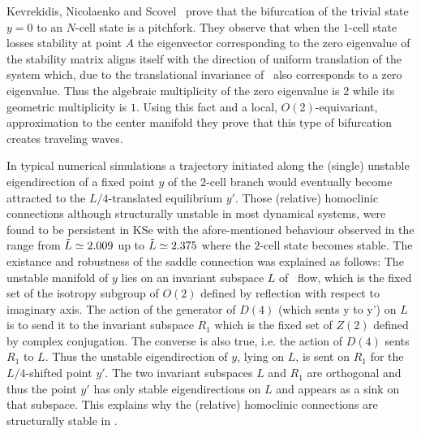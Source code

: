 {Kevrekidis, Nicolaenko and Scovel~
prove that the bifurcation of the trivial state $y=0$ to an $N$-cell state is a pitchfork.
They observe that when the $1$-cell state losses stability at point $A$ the
eigenvector corresponding to the zero eigenvalue of the stability matrix aligns itself with the direction of uniform translation of the
system which, due to the translational invariance of \KSe\, also corresponds to a zero eigenvalue. Thus the algebraic multiplicity of the zero eigenvalue is $2$ while its geometric multiplicity is $1$. Using this fact and a local, $O(2)$-equivariant, approximation to the center manifold they prove that this type of bifurcation creates traveling waves.

In typical numerical simulations  a trajectory initiated along the (single) unstable eigendirection of a
fixed point $y$ of the $2$-cell branch would eventually become attracted to the $L/4$-translated equilibrium $y'$.
Those (relative) homoclinic connections
 although structurally unstable in most dynamical systems, were found to be persistent in KSe with the afore-mentioned behaviour observed in the range
from $\tilde{L}\simeq 2.009$ up to $\tilde{L}\simeq 2.375$  where the $2$-cell state becomes stable. The existance and
robustness of the saddle connection was explained as follows:  The unstable manifold of $y$ lies on an invariant subspace $L$ of
\KS\ flow, which is the fixed set of the isotropy subgroup of $O(2)$ defined by reflection with respect to imaginary axis. The action of the generator of $D(4)$ (which sents y to y') on $L$ is to send it to the invariant subspace $R_{1}$ which is the fixed set of $Z(2)$ defined by complex
conjugation. The converse is also true, i.e. the action of $D(4)$ sents $R_{1}$ to $L$. Thus the unstable eigendirection of $y$, lying on $L$, is sent on $R_{1}$ for the $L/4$-shifted point $y'$. The two invariant subspaces $L$ and $R_{1}$ are orthogonal and thus the point $y'$ has only stable eigendirections on $L$ and appears as a sink on that subspace. This explains why the (relative) homoclinic connections are structurally stable in \KSe.

}
